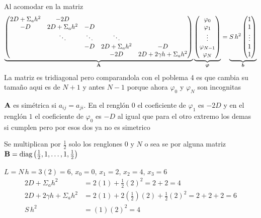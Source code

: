 Al acomodar en la matriz
\[
\underbrace{
	\begin{pmatrix}
		2D + \Sigma_a h^2 & -2D & & & \\
		-D & 2D + \Sigma_a h^2 & -D & & \\
		& \ddots & \ddots & \ddots & \\
		& & -D & 2D + \Sigma_a h^2 & -D\\
		& & & -2D & 2D + 2\gamma h + \Sigma_a h^2
\end{pmatrix}}_{\mathbf{A}}
\underbrace{\begin{pmatrix} \varphi_0\\ \varphi_1\\ \vdots\\ \varphi_{N-1}\\ \varphi_N \end{pmatrix}}_{\bm{\varphi}}
=
\underbrace{S\,h^2\begin{pmatrix} 1\\ 1\\ \vdots\\ 1\\ 1 \end{pmatrix}}_{\bm{b}}
\]
La matriz es tridiagonal pero comparandola con el poblema 4 es que cambia su tamaño aqui es de $N+1$ y antes $N-1$ porque ahora $\varphi_0$ y $\varphi_N$ son incognitas 

$\mathbf{A}$ es simétrica si $a_{ij} = a_{ji}$. En el renglón $0$ el coeficiente de $\varphi_1$ es $-2D$ y en el renglón $1$ el coeficiente de $\varphi_0$ es $-D$ al igual que para el otro extremo los demas si cumplen pero por esos dos ya no es simetrico 

Se multiplican por $\tfrac12$ solo los renglones $0$ y $N$ o sea se por alguna matriz$\mathbf{B} = \text{diag}\left(\tfrac12, 1, \dots, 1, \tfrac12\right)$ 







$L = N\,h = 3(2) = 6$, $x_0 = 0$, $x_1 = 2$, $x_2 = 4$, $x_3 = 6$
\begin{align*}
	2D + \Sigma_a h^2 &= 2(1) + \tfrac12(2)^2 = 2 + 2 = 4\\
	2D + 2\gamma h + \Sigma_a h^2 &= 2(1) + 2\left(\tfrac12\right)(2) + \tfrac12(2)^2 = 2 + 2 + 2 = 6\\
	S\,h^2 &= (1)(2)^2 = 4
\end{align*}

